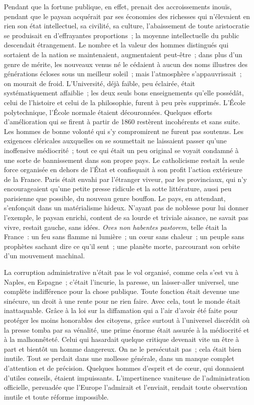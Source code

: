 \documentclass[french,twoside]{book} %
\begin{document}
Pendant que la fortune publique, en effet, prenait des accroissements inouïs, pendant que le paysan acquérait par ses économies des richesses qui n’élevaient en rien son état intellectuel, sa civilité, sa culture, l’abaissement de toute aristocratie se produisait en d’effrayantes proportions ; la moyenne intellectuelle du public descendait étrangement. Le nombre et la valeur des hommes distingués qui sortaient de la nation se maintenaient, augmentaient peut-être ; dans plus d’un genre de mérite, les nouveaux venus né le cédaient à aucun des noms illustres des générations écloses sous un meilleur soleil ; mais l’atmosphère s’appauvrissait ; on mourait de froid. L’Université, déjà faible, peu éclairée, était systématiquement affaiblie ; les deux seuls bons enseignements qu’elle possédât, celui de l’histoire et celui de la philosophie, furent à peu près supprimés. L’École polytechnique, l’École normale étaient découronnées. Quelques efforts d’amélioration qui se firent à partir de 1860 restèrent incohérents et sans suite. Les hommes de bonne volonté qui s’y compromirent ne furent pas soutenus. Les exigences cléricales auxquelles on se soumettait ne laissaient passer qu’une inoffensive médiocrité ; tout ce qui était un peu original se voyait condamné à une sorte de bannissement dans son propre pays. Le catholicisme restait la seule force organisée en dehors de l’État et confisquait à son profit l’action extérieure de la France. Paris était envahi par l’étranger viveur, par les provinciaux, qui n’y encourageaient qu’une petite presse ridicule et la sotte littérature, aussi peu parisienne que possible, du nouveau genre bouffon. Le pays, en attendant, s’enfonçait dans un matérialisme hideux. N’ayant pas de noblesse pour lui donner l’exemple, le paysan enrichi, content de sa lourde et triviale aisance, ne savait pas vivre, restait gauche, sans idées. {\itshape Oves non habentes pastorem}, telle était la France : un feu sans flamme ni lumière ; un cœur sans chaleur ; un peuple sans prophètes sachant dire ce qu’il sent ; une planète morte, parcourant son orbite d’un mouvement machinal.\par
La corruption administrative n’était pas le vol organisé, comme cela s’est vu à Naples, en Espagne ; c’était l’incurie, la paresse, un laisser-aller universel, une complète indifférence pour la chose publique. Toute fonction était devenue une sinécure, un droit à une rente pour ne rien faire. Avec cela, tout le monde était inattaquable. Grâce à la loi sur la diffamation qui a l’air d’avoir été faite pour protéger les moins honorables des citoyens, grâce surtout à l’universel discrédit où la presse tomba par sa vénalité, une prime énorme était assurée à la médiocrité et à la malhonnêteté. Celui qui hasardait quelque critique devenait vite un être à part et bientôt un homme dangereux. On ne le persécutait pas ; cela était bien inutile. Tout se perdait dans une mollesse générale, dans un manque complet d’attention et de précision. Quelques hommes d’esprit et de cœur, qui donnaient d’utiles conseils, étaient impuissants. L’impertinence vaniteuse de l’administration officielle, persuadée que l’Europe l’admirait et l’enviait, rendait toute observation inutile et toute réforme impossible.\par
\end{document}
